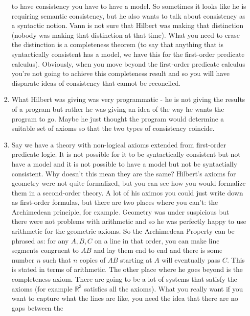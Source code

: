 \documentclass[12pt]{article}
\theoremstyle{definition}
\begin{document}
\begin{enumerate}
        to have consistency you have to have a model. So sometimes it looks
        like he is requiring semantic consistency, but he also wants to talk
        about consistency as a syntactic notion. Vann is not sure that Hilbert
        was making that distinction (nobody was making that distinction at that
        time). What you need to erase the distinction is a completeness theorem
        (to say that anything that is syntactically consistent has a model, we
        have this for the first-order predicate calculus). Obviously, when you
        move beyond the first-order predicate calculus you're not going to
        achieve this completeness result and so you will have disparate ideas
        of consistency that cannot be reconciled.
    \item
        What Hilbert was giving was very programmatic - he is not giving the
        results of a program but rather he was giving an idea of the way he
        wants the program to go. Maybe he just thought the program would
        determine a suitable set of axioms so that the two types of consistency
        coincide.
    \item
        Say we have a theory with non-logical axioms extended from first-order
        predicate logic. It is not possible for it to be syntactically
        consistent but not have a model and it is not possible to have a model
        but not be syntactially consistent. Why doesn't this mean they are the
        same? Hilbert's axioms for geometry were not quite formalized, but you
        can see how you would formalize them in a second-order theory. A lot of
        his aximos you could just write down as first-order formulas, but there
        are two places where you can't: the Archimedean principle, for example.
        Geometry was under suspicious but there were not problems with
        arithmetic and so he was perfectly happy to use arithmetic for the
        geometric axioms. So the Archimedean Property can be phrased as: for
        any $A, B, C$ on a line in that order, you can make line segments
        congruent to $AB$ and lay them end to end and there is some number $n$
        such that $n$ copies of $AB$ starting at $A$ will eventually pass $C$.
        This is stated in terms of arithmetic. The other place where he goes
        beyond is the completeness axiom. There are going to be a lot of
        systems that satisfy the axioms (for example $\mathbb{R}^3$ satisfies
        all the axioms). What you really want if you want to capture what the
        lines are like, you need the idea that there are no gaps between the

\end{enumerate}
\end{document}
